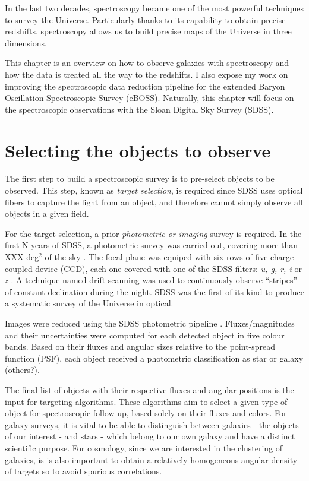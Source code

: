 \chaptertoc{}


\vspace{1em}

In the last two decades, spectroscopy became one of the most powerful
techniques to survey the Universe. Particularly thanks to its 
capability to obtain precise redshifts, spectroscopy allows
us to build precise maps of the Universe in three dimensions. 

This chapter is an overview on how to observe galaxies with 
spectroscopy and how the data is treated all the way to the 
redshifts. I also expose my work on improving the spectroscopic
data reduction pipeline for the extended Baryon Oscillation 
Spectroscopic Survey (eBOSS). Naturally, this chapter will 
focus on the spectroscopic observations with the 
Sloan Digital Sky Survey (SDSS).


\section{Selecting the objects to observe}
\label{spectro:target}

The first step to build a spectroscopic survey is to pre-select 
objects to be observed. This step, known as \emph{target
selection}, is required since SDSS uses optical fibers to 
capture the light from an object, and therefore cannot simply
observe all objects in a given field. 

For the target selection, a prior \emph{photometric or imaging} 
survey is required. In the first N years of SDSS, a photometric
survey was carried out, covering more than 
XXX deg$^2$ of the sky \cite{yorkSloanDigitalSky2000}. 
The focal plane was equiped with six rows of five 
charge coupled device (CCD), each one covered with one of 
the SDSS filters: \textit{u, g, r, i} or \textit{z} 
\cite{gunnSloanDigitalSky1998, doiPhotometricResponseFunctions2010}.
A technique named drift-scanning was used to continuously observe 
``stripes'' of constant declination during the night.
SDSS was the first of its kind to produce a systematic survey 
of the Universe in optical.

Images were reduced using the SDSS photometric pipeline 
\cite{sdss_photo_pipe}. Fluxes/magnitudes and their uncertainties 
were computed for each detected object in five colour bands. 
Based on their fluxes and angular sizes relative to the 
point-spread function (PSF), each object received a 
photometric classification as star or galaxy (others?).

The final list of objects with their respective fluxes and 
angular positions is the input for targeting algorithms. 
These algorithms aim to select a given type of object for 
spectroscopic follow-up, based solely on their fluxes and colors. 
For galaxy surveys, it is vital to be able to distinguish between 
galaxies - the objects of our interest - and stars - which belong
to our own galaxy and have a distinct scientific purpose. 
For cosmology, since we are interested in the clustering of 
galaxies, is is also important to obtain a relatively 
homogeneous angular density of targets so to avoid spurious 
correlations. 

